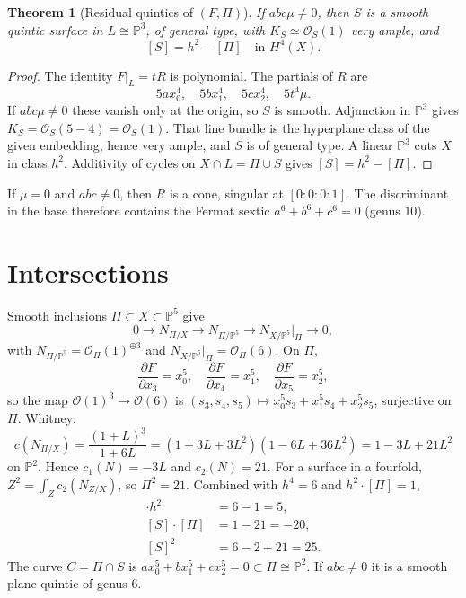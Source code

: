 \documentclass[11pt]{article}
\newtheorem{theorem}{Theorem}
\theoremstyle{definition}
\theoremstyle{remark}
\begin{document}
\begin{theorem}[Residual quintics of \((F,\Pi)\)]
If \(abc\mu\neq 0\), then \(S\) is a smooth quintic surface in \(L\cong\mathbb{P}^3\), of general type, with \(K_S\simeq\mathcal{O}_S(1)\) very ample, and
\[
[S]=h^2-[\Pi]\quad\text{in }H^4(X).
\]
\end{theorem}

\begin{proof}
The identity \(F|_L=tR\) is polynomial. The partials of \(R\) are
\[
5ax_0^4,\quad 5bx_1^4,\quad 5cx_2^4,\quad 5t^4\mu.
\]
If \(abc\mu\neq 0\) these vanish only at the origin, so \(S\) is smooth. Adjunction in \(\mathbb{P}^3\) gives \(K_S=\mathcal{O}_S(5-4)=\mathcal{O}_S(1)\). That line bundle is the hyperplane class of the given embedding, hence very ample, and \(S\) is of general type. A linear \(\mathbb{P}^3\) cuts \(X\) in class \(h^2\). Additivity of cycles on \(X\cap L=\Pi\cup S\) gives \([S]=h^2-[\Pi]\).
\end{proof}

If \(\mu=0\) and \(abc\neq 0\), then \(R\) is a cone, singular at \([0:0:0:1]\). The discriminant in the base therefore contains the Fermat sextic \(a^6+b^6+c^6=0\) (genus \(10\)).

\section{Intersections}

Smooth inclusions \(\Pi\subset X\subset\mathbb{P}^5\) give
\[
0\to N_{\Pi/X}\to N_{\Pi/\mathbb{P}^5}\to N_{X/\mathbb{P}^5}\big|_{\Pi}\to 0,
\]
with \(N_{\Pi/\mathbb{P}^5}=\mathcal{O}_\Pi(1)^{\oplus 3}\) and \(N_{X/\mathbb{P}^5}|_\Pi=\mathcal{O}_\Pi(6)\). On \(\Pi\),
\[
\frac{\partial F}{\partial x_3}=x_0^5,\quad
\frac{\partial F}{\partial x_4}=x_1^5,\quad
\frac{\partial F}{\partial x_5}=x_2^5,
\]
so the map \(\mathcal{O}(1)^3\to\mathcal{O}(6)\) is \((s_3,s_4,s_5)\mapsto x_0^5 s_3+x_1^5 s_4+x_2^5 s_5\), surjective on \(\Pi\). Whitney:
\[
c(N_{\Pi/X})=\frac{(1+L)^3}{1+6L}=(1+3L+3L^2)(1-6L+36L^2)=1-3L+21L^2
\]
on \(\mathbb{P}^2\). Hence \(c_1(N)=-3L\) and \(c_2(N)=21\). For a surface in a fourfold, \(Z^2=\int_Z c_2(N_{Z/X})\), so \(\Pi^2=21\). Combined with \(h^4=6\) and \(h^2\cdot[\Pi]=1\),
\begin{align*}
[S]\cdot h^2&=6-1=5,\\
[S]\cdot[\Pi]&=1-21=-20,\\
[S]^2&=6-2+21=25.
\end{align*}
The curve \(C=\Pi\cap S\) is \(ax_0^5+bx_1^5+cx_2^5=0\subset\Pi\cong\mathbb{P}^2\). If \(abc\neq 0\) it is a smooth plane quintic of genus \(6\).
\end{document}
